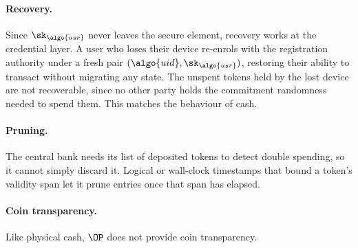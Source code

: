 \paragraph{Recovery.} Since $\sk_{\algo{usr}}$ never leaves the secure element, recovery works at the
credential layer. A user who loses their device
re-enrols with the registration authority under a fresh pair $(\algo{uid},
\sk_{\algo{usr}})$, restoring their ability to transact without migrating any
state. The unspent tokens held by the lost device are not recoverable, since no
other party holds the commitment randomness needed to spend them. This matches
the behaviour of cash.

\paragraph{Pruning.} The central bank needs its list of deposited tokens to detect double spending,
so it cannot simply discard it. Logical or wall-clock timestamps that bound a
token's validity span let it prune entries once that span has elapsed.

\paragraph{Coin transparency.} Like physical cash, $\OP$ does not provide coin
transparency.
